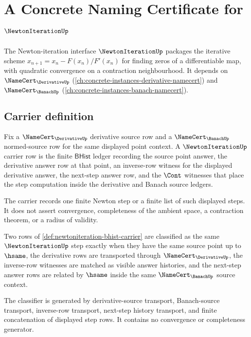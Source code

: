 \chapter{A Concrete Naming Certificate for $\NewtonIterationUp$}
\label{ch:concrete-instances-newtoniteration-namecert}

The Newton-iteration interface $\NewtonIterationUp$ packages the iterative scheme $x_{n+1} = x_n - F(x_n)/F'(x_n)$ for finding zeros of a differentiable map, with quadratic convergence on a contraction neighbourhood. It depends on $\NameCert_{\DerivativeUp}$ (\autoref{ch:concrete-instances-derivative-namecert}) and $\NameCert_{\BanachUp}$ (\autoref{ch:concrete-instances-banach-namecert}).

\section{Carrier definition}
\label{sec:newtoniteration-carrier}

\begin{definition}
\label{def:newtoniteration-bhist-carrier}
Fix a $\NameCert_{\DerivativeUp}$ derivative source row and a $\NameCert_{\BanachUp}$ normed-source row for the same displayed point context. A $\NewtonIterationUp$ carrier row is the finite $\mathsf{BHist}$ ledger recording the source point answer, the derivative answer row at that point, an inverse-row witness for the displayed derivative answer, the next-step answer row, and the $\Cont$ witnesses that place the step computation inside the derivative and Banach source ledgers.

The carrier records one finite Newton step or a finite list of such displayed steps. It does not assert convergence, completeness of the ambient space, a contraction theorem, or a radius of validity.
\end{definition}

\begin{definition}
\label{def:newtoniteration-contraction-classifier}
Two rows of \autoref{def:newtoniteration-bhist-carrier} are classified as the same $\NewtonIterationUp$ step exactly when they have the same source point up to $\hsame$, the derivative rows are transported through $\NameCert_{\DerivativeUp}$, the inverse-row witnesses are matched as visible answer histories, and the next-step answer rows are related by $\hsame$ inside the same $\NameCert_{\BanachUp}$ source context.

The classifier is generated by derivative-source transport, Banach-source transport, inverse-row transport, next-step history transport, and finite concatenation of displayed step rows. It contains no convergence or completeness generator.
\end{definition}

